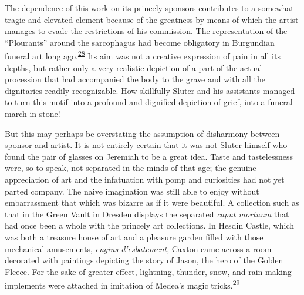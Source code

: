 The dependence of this work on its princely sponsors contributes to a
somewhat tragic and elevated element because of the greatness by means
of which the artist manages to evade the restrictions of his commission.
The representation of the ``Plourants'' around the sarcophagus had
become obligatory in Burgundian funeral art long
ago.\textsuperscript{\protect\hypertarget{20_ILLUSTRATIONS_FOLLOW_PAGE.xhtmlux5cux23id_417}{\protect\hyperlink{23_NOTES.xhtmlux5cux23id_418}{28}}}
Its aim was not a creative expression of pain in all its depths, but
rather only a very realistic depiction of a part of the actual
procession that had accompanied the body to the grave and with all the
dignitaries readily recognizable. How skillfully Sluter and his
assistants managed to turn this motif into a profound and dignified
depiction of grief, into a funeral march in stone!

But this may perhaps be overstating the assumption of disharmony between
sponsor and artist. It is not entirely certain that it was not Sluter
himself who found the pair of glasses on Jeremiah to be a great idea.
Taste and tastelessness were, so to speak, not separated in the minds of
that age; the genuine appreciation of art and the infatuation with pomp
and curiosities had not yet parted company. The naive imagination was
still able to enjoy without embarrassment that which was bizarre as if
it were beautiful. A collection such as that in the Green Vault in
Dresden displays the separated \emph{caput mortuum} that had once been a
whole with the princely art collections. In Hesdin Castle, which was
both a treasure house of art and a pleasure garden filled with those
mechanical
\protect\hypertarget{20_ILLUSTRATIONS_FOLLOW_PAGE.xhtmlux5cux23page_311}{}{}amusements,
\emph{engins d'esbatement}, Caxton came across a room decorated with
paintings depicting the story of Jason, the hero of the Golden Fleece.
For the sake of greater effect, lightning, thunder, snow, and rain
making implements were attached in imitation of Medea's magic
tricks.\textsuperscript{\protect\hypertarget{20_ILLUSTRATIONS_FOLLOW_PAGE.xhtmlux5cux23id_415}{\protect\hyperlink{23_NOTES.xhtmlux5cux23id_416}{29}}}

